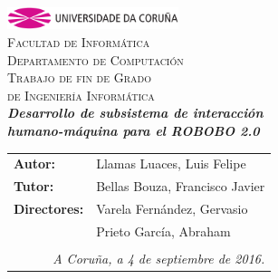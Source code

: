 \begin{titlepage}
\begin{center}
\includegraphics[width=5cm]{imagenes/anagramaUDC.png}\\[0.5cm]
{\textsc{Facultad de Informática}} \\
{\large \textsc{Departamento de Computación}} \\[1cm]
{\Large \textsc{Trabajo de fin de Grado}} \\
{\Large \textsc{de Ingeniería Informática}} \\[2cm]
{\Large \textsl{\textbf{Desarrollo de subsistema de interacción  }}} \\[0.15cm]
{\Large \textsl{\textbf{humano-máquina para el ROBOBO 2.0}}} \\

\vfill
\begin{flushright}
\begin{tabular}{ll}
\textbf{Autor:}    & Llamas Luaces, Luis Felipe \\
\textbf{Tutor:} & Bellas Bouza, Francisco Javier \\
\textbf{Directores:}  & Varela Fernández, Gervasio \\ & Prieto García, Abraham  \\
& \\
\multicolumn{2}{r}{\small \emph{A Coruña, a 4 de septiembre de 2016.}} \\
\end{tabular}
\end{flushright}
\end{center}
\end{titlepage}

